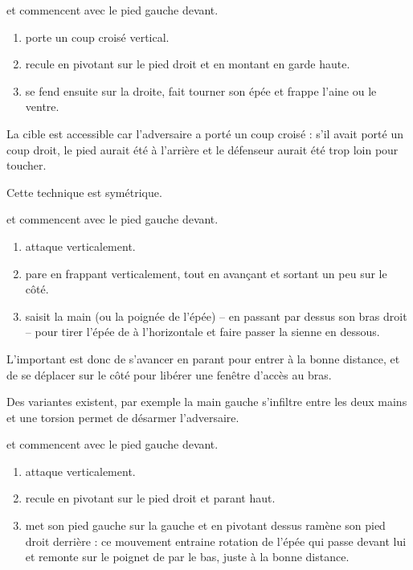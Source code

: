 \begin{technique}

\A et \D commencent avec le pied gauche devant.

\begin{enumerate}
	\item \A porte un coup croisé vertical.
	
	\item \D recule en pivotant sur le pied droit et en montant en garde haute.
	
	\item \D se fend ensuite sur la droite, fait tourner son épée et frappe l'aine ou le ventre.
\end{enumerate}

La cible est accessible car l'adversaire a porté un coup croisé : s'il avait porté un coup droit, le pied aurait été à l'arrière et le défenseur aurait été trop loin pour toucher.

Cette technique est symétrique.
\end{technique}


\begin{technique}

\A et \D commencent avec le pied gauche devant.

\begin{enumerate}
	\item \A attaque verticalement.
	
	\item \D pare en frappant verticalement, tout en avançant et sortant un peu sur le côté.
	
	\item \D saisit la main (ou la poignée de l'épée) -- en passant par dessus son bras droit -- pour tirer l'épée de \A à l'horizontale et faire passer la sienne en dessous.
\end{enumerate}

L'important est donc de s'avancer en parant pour entrer à la bonne distance, et de se déplacer sur le côté pour libérer une fenêtre d'accès au bras.

Des variantes existent, par exemple la main gauche s'infiltre entre les deux mains et une torsion permet de désarmer l'adversaire.
\end{technique}


\begin{technique}

\A et \D commencent avec le pied gauche devant.

\begin{enumerate}
	\item \A attaque verticalement.
	
	\item \D recule en pivotant sur le pied droit et parant haut.
	
	\item \D met son pied gauche sur la gauche et en pivotant dessus ramène son pied droit derrière : ce mouvement entraine rotation de l'épée qui passe devant lui et remonte sur le poignet de \A par le bas, juste à la bonne distance.
\end{enumerate}
\end{technique}


